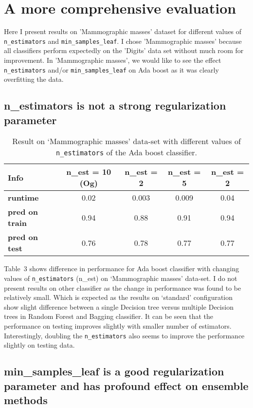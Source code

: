 \documentclass[12pt]{article}
\begin{document}
\section*{A more comprehensive evaluation}

Here I present results on 'Mammographic masses' dataset for different values of \texttt{n\_estimators} and \texttt{min\_samples\_leaf}. I chose 'Mammographic masses' because all classifiers perform expectedly on the 'Digits' data set without much room for improvement. In 'Mammographic masses', we would like to see the effect \texttt{n\_estimators} and/or \texttt{min\_samples\_leaf} on Ada boost as it was clearly overfitting the data.

\subsection*{n\_estimators is not a strong regularization parameter}

\begin{table}[!hptb]
\centering
\begin{tabular}{|l|c|c|c|c|}
\hline
\textbf{Info} & \textbf{n\_est = 10 (Og)} & \textbf{n\_est = 2} & \textbf{n\_est = 5} & \textbf{n\_est = 2} \\\hline
\textbf{runtime} & 0.02 & 0.003 & 0.009 & 0.04 \\
\textbf{pred on train} & 0.94 & 0.88 & 0.91 & 0.94 \\
\textbf{pred on test} & 0.76 & 0.78 & 0.77 & 0.77 \\\hline
\end{tabular}
\caption{Result on `Mammographic masses' data-set with different values of \texttt{n\_estimators} of the Ada boost classifier.}
\end{table}

Table~3 shows difference in performance for Ada boost classifier with changing values of \texttt{n\_estimators} (n\_est) on `Mammographic masses' data-set. I do not present results on other classifier as the change in performance was found to be relatively small. Which is expected as the results on `standard' configuration show slight difference between a single Decision tree versus multiple Decision trees in Random Forest and Bagging classifier. It can be seen that the performance on testing improves slightly with smaller number of estimators. Interestingly, doubling the \texttt{n\_estimators} also seems to improve the performance slightly on testing data.

\subsection*{min\_samples\_leaf is a good regularization parameter and has profound effect on ensemble methods}
\end{document}
